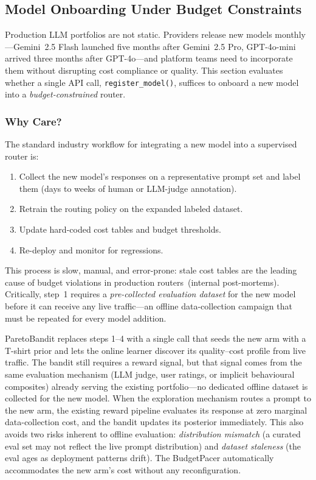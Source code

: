 
\subsection{Model Onboarding Under Budget Constraints}
\label{appendix:model_onboarding}

Production LLM portfolios are not static.
Providers release new models monthly---Gemini~2.5 Flash launched five
months after Gemini~2.5 Pro, GPT-4o-mini arrived three months after
GPT-4o---and platform teams need to incorporate them without
disrupting cost compliance or quality.
This section evaluates whether a single API call,
\texttt{register\_model()}, suffices to onboard a new model into a
\emph{budget-constrained} router.

\subsubsection{Why Care?}

The standard industry workflow for integrating a new model into a
supervised router is:
\begin{enumerate}[nosep,leftmargin=*]
  \item Collect the new model's responses on a representative prompt
    set and label them (days to weeks of human or LLM-judge
    annotation).
  \item Retrain the routing policy on the expanded labeled dataset.
  \item Update hard-coded cost tables and budget thresholds.
  \item Re-deploy and monitor for regressions.
\end{enumerate}
This process is slow, manual, and error-prone: stale cost tables
are the leading cause of budget violations in production
routers~(internal post-mortems).
Critically, step~1 requires a \emph{pre-collected evaluation dataset}
for the new model before it can receive any live traffic---an
offline data-collection campaign that must be repeated for every
model addition.

ParetoBandit replaces steps 1--4 with a single call that seeds the new
arm with a T-shirt prior and lets the online learner discover its
quality--cost profile from live traffic.
The bandit still requires a reward signal, but that signal comes
from the same evaluation mechanism (LLM judge, user ratings, or
implicit behavioural composites) already serving the existing
portfolio---no dedicated offline dataset is collected for the new
model.
When the exploration mechanism routes a prompt to the new arm, the
existing reward pipeline evaluates its response at zero marginal
data-collection cost, and the bandit updates its posterior
immediately.
This also avoids two risks inherent to offline evaluation:
\emph{distribution mismatch} (a curated eval set may not reflect the
live prompt distribution) and \emph{dataset staleness} (the eval ages
as deployment patterns drift).
The BudgetPacer automatically accommodates the new arm's cost
without any reconfiguration.

